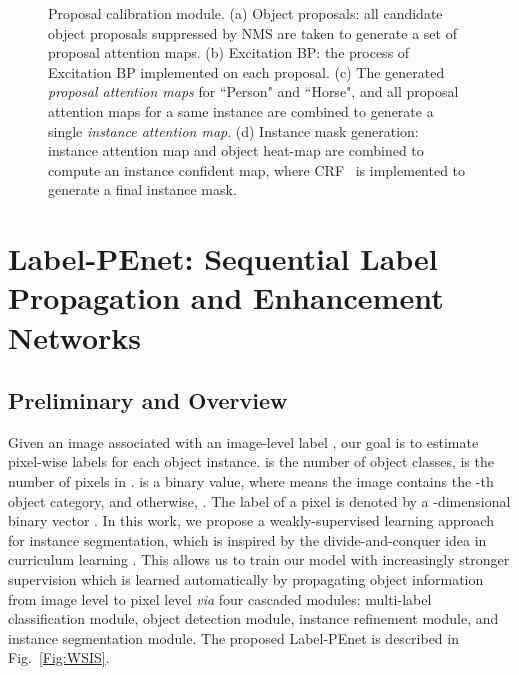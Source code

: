\documentclass[10pt,twocolumn,letterpaper]{article}
\begin{document}
\begin{figure*}[ht]
	\centering

\caption{Proposal calibration module. (a) Object proposals: all candidate object proposals suppressed by NMS are taken to generate a set of proposal attention maps. (b) Excitation BP: the process of Excitation BP implemented on each proposal. (c) The generated \emph{proposal attention maps} for ``Person" and ``Horse", and all proposal attention maps for a same instance are combined to generate a single \emph{instance attention map}. (d) Instance mask generation: instance attention map and object heat-map are combined to compute an instance confident map, where CRF~\cite{krahenbuhl2011efficient} is implemented to generate a final instance mask.}
\label{Fig:Proposal Dissection}
\end{figure*}

\section{Label-PEnet: Sequential Label Propagation and Enhancement Networks}

\subsection{Preliminary and Overview}
Given an image  associated with an image-level label , our goal is to estimate pixel-wise labels  for each object instance.  is the number of object classes,  is the number of pixels in .  is a binary value, where  means the image  contains the -th object category, and otherwise, . The label of a pixel  is denoted by a -dimensional binary vector .
In this work, we propose a weakly-supervised learning approach for instance segmentation, which is inspired by the divide-and-conquer idea in curriculum learning \cite{bengio2009curriculum}. This allows us to train our model with increasingly stronger supervision which is learned automatically by propagating object information from image level to pixel level \emph{via} four cascaded modules: multi-label classification module, object detection module, instance refinement module, and instance segmentation module. The proposed Label-PEnet is described in Fig.~\ref{Fig:WSIS}.
\end{document}
